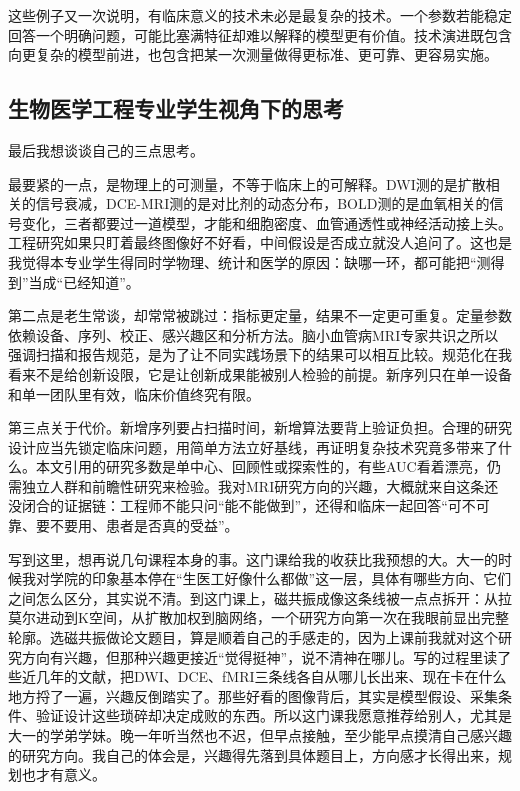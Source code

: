 这些例子又一次说明，有临床意义的技术未必是最复杂的技术。一个参数若能稳定回答一个明确问题，可能比塞满特征却难以解释的模型更有价值。技术演进既包含向更复杂的模型前进，也包含把某一次测量做得更标准、更可靠、更容易实施。

\subsection{生物医学工程专业学生视角下的思考}

最后我想谈谈自己的三点思考。

最要紧的一点，是物理上的可测量，不等于临床上的可解释。DWI测的是扩散相关的信号衰减，DCE-MRI测的是对比剂的动态分布，BOLD测的是血氧相关的信号变化，三者都要过一道模型，才能和细胞密度、血管通透性或神经活动接上头。工程研究如果只盯着最终图像好不好看，中间假设是否成立就没人追问了。这也是我觉得本专业学生得同时学物理、统计和医学的原因：缺哪一环，都可能把“测得到”当成“已经知道”。

第二点是老生常谈，却常常被跳过：指标更定量，结果不一定更可重复。定量参数依赖设备、序列、校正、感兴趣区和分析方法。脑小血管病MRI专家共识之所以强调扫描和报告规范，是为了让不同实践场景下的结果可以相互比较\cite{csvd2024consensus}。规范化在我看来不是给创新设限，它是让创新成果能被别人检验的前提。新序列只在单一设备和单一团队里有效，临床价值终究有限。

第三点关于代价。新增序列要占扫描时间，新增算法要背上验证负担。合理的研究设计应当先锁定临床问题，用简单方法立好基线，再证明复杂技术究竟多带来了什么。本文引用的研究多数是单中心、回顾性或探索性的，有些AUC看着漂亮，仍需独立人群和前瞻性研究来检验。我对MRI研究方向的兴趣，大概就来自这条还没闭合的证据链：工程师不能只问“能不能做到”，还得和临床一起回答“可不可靠、要不要用、患者是否真的受益”。

写到这里，想再说几句课程本身的事。这门课给我的收获比我预想的大。大一的时候我对学院的印象基本停在“生医工好像什么都做”这一层，具体有哪些方向、它们之间怎么区分，其实说不清。到这门课上，磁共振成像这条线被一点点拆开：从拉莫尔进动到K空间，从扩散加权到脑网络，一个研究方向第一次在我眼前显出完整轮廓。选磁共振做论文题目，算是顺着自己的手感走的，因为上课前我就对这个研究方向有兴趣，但那种兴趣更接近“觉得挺神”，说不清神在哪儿。写的过程里读了些近几年的文献，把DWI、DCE、fMRI三条线各自从哪儿长出来、现在卡在什么地方捋了一遍，兴趣反倒踏实了。那些好看的图像背后，其实是模型假设、采集条件、验证设计这些琐碎却决定成败的东西。所以这门课我愿意推荐给别人，尤其是大一的学弟学妹。晚一年听当然也不迟，但早点接触，至少能早点摸清自己感兴趣的研究方向。我自己的体会是，兴趣得先落到具体题目上，方向感才长得出来，规划也才有意义。
